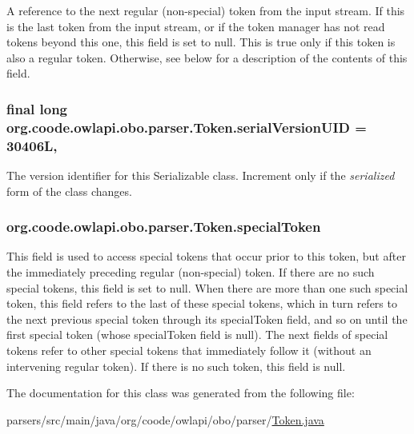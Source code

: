 A reference to the next regular (non-\/special) token from the input stream. If this is the last token from the input stream, or if the token manager has not read tokens beyond this one, this field is set to null. This is true only if this token is also a regular token. Otherwise, see below for a description of the contents of this field. \hypertarget{classorg_1_1coode_1_1owlapi_1_1obo_1_1parser_1_1_token_a625c8aed5b07f8da35ebf78ea7d42aef}{
\subsubsection[{serial\-Version\-U\-I\-D}]{\setlength{\rightskip}{0pt plus 5cm}final long org.\-coode.\-owlapi.\-obo.\-parser.\-Token.\-serial\-Version\-U\-I\-D = 30406\-L\hspace{0.3cm}{\ttfamily [static]}, {\ttfamily [private]}}}\label{classorg_1_1coode_1_1owlapi_1_1obo_1_1parser_1_1_token_a625c8aed5b07f8da35ebf78ea7d42aef}
The version identifier for this Serializable class. Increment only if the {\itshape serialized} form of the class changes. \hypertarget{classorg_1_1coode_1_1owlapi_1_1obo_1_1parser_1_1_token_a7db9b82cd12c88b878b37d359952c923}{
\subsubsection[{special\-Token}]{ org.\-coode.\-owlapi.\-obo.\-parser.\-Token.\-special\-Token}}\label{classorg_1_1coode_1_1owlapi_1_1obo_1_1parser_1_1_token_a7db9b82cd12c88b878b37d359952c923}
This field is used to access special tokens that occur prior to this token, but after the immediately preceding regular (non-\/special) token. If there are no such special tokens, this field is set to null. When there are more than one such special token, this field refers to the last of these special tokens, which in turn refers to the next previous special token through its special\-Token field, and so on until the first special token (whose special\-Token field is null). The next fields of special tokens refer to other special tokens that immediately follow it (without an intervening regular token). If there is no such token, this field is null. 

The documentation for this class was generated from the following file\-:\begin{DoxyCompactItemize}
\item 
parsers/src/main/java/org/coode/owlapi/obo/parser/\hyperlink{org_2coode_2owlapi_2obo_2parser_2_token_8java}{Token.\-java}\end{DoxyCompactItemize}
